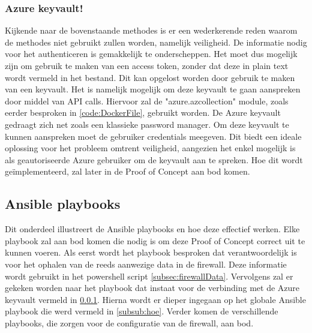 \subsubsection{Azure keyvault!}
\label{subsec:Azure keyvault}
Kijkende naar de bovenstaande methodes is er een wederkerende reden waarom de methodes niet gebruikt zullen worden, namelijk veiligheid. De informatie nodig voor het authenticeren is gemakkelijk te onderscheppen. Het moet dus mogelijk zijn om gebruik te maken van een access token, zonder dat deze in plain text wordt vermeld in het bestand. Dit kan opgelost worden door gebruik te maken van een keyvault. Het is namelijk mogelijk om deze keyvault te gaan aanspreken door middel van API calls. Hiervoor zal de "azure.azcollection" module, zoals eerder besproken in \ref{code:DockerFile}, gebruikt worden. De Azure keyvault gedraagt zich net zoals een klassieke password manager. Om deze keyvault te kunnen aanspreken moet de gebruiker credentials meegeven. Dit biedt een ideale oplossing voor het probleem omtrent veiligheid, aangezien het enkel mogelijk is als geautoriseerde Azure gebruiker om de keyvault aan te spreken. Hoe dit wordt geïmplementeerd, zal later in de Proof of Concept aan bod komen. 

\subsection{Ansible playbooks}
\label{subsec:playbooks}
Dit onderdeel illustreert de Ansible playbooks en hoe deze effectief werken. Elke playbook zal aan bod komen die nodig is om deze Proof of Concept correct uit te kunnen voeren. Als eerst wordt het playbook besproken dat verantwoordelijk is voor het ophalen van de reeds aanwezige data in de firewall. Deze informatie wordt gebruikt in het powershell script \ref{subsec:firewallData}. Vervolgens zal er gekeken worden naar het playbook dat instaat voor de verbinding met de Azure keyvault vermeld in \ref{subsec:Azure keyvault}. Hierna wordt er dieper ingegaan op het globale Ansible playbook die werd vermeld in \ref{subsub:hoe}. Verder komen de verschillende playbooks, die zorgen voor de configuratie van de firewall, aan bod.

